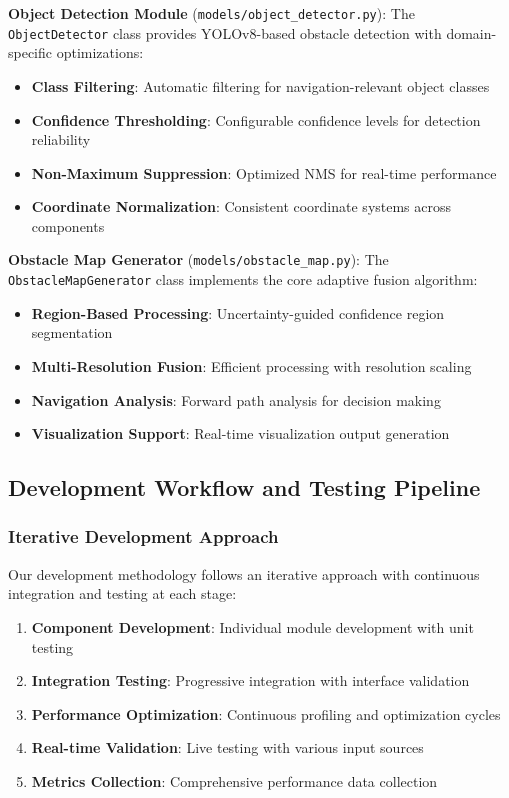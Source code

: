 \documentclass[12pt,oneside]{book}
\begin{document}
\textbf{Object Detection Module} (\texttt{models/object\_detector.py}):
The \texttt{ObjectDetector} class provides YOLOv8-based obstacle detection with domain-specific optimizations:

\begin{itemize}
\item \textbf{Class Filtering}: Automatic filtering for navigation-relevant object classes
\item \textbf{Confidence Thresholding}: Configurable confidence levels for detection reliability
\item \textbf{Non-Maximum Suppression}: Optimized NMS for real-time performance
\item \textbf{Coordinate Normalization}: Consistent coordinate systems across components
\end{itemize}

\textbf{Obstacle Map Generator} (\texttt{models/obstacle\_map.py}):
The \texttt{ObstacleMapGenerator} class implements the core adaptive fusion algorithm:

\begin{itemize}
\item \textbf{Region-Based Processing}: Uncertainty-guided confidence region segmentation
\item \textbf{Multi-Resolution Fusion}: Efficient processing with resolution scaling
\item \textbf{Navigation Analysis}: Forward path analysis for decision making
\item \textbf{Visualization Support}: Real-time visualization output generation
\end{itemize}

\subsection{Development Workflow and Testing Pipeline}

\subsubsection{Iterative Development Approach}

Our development methodology follows an iterative approach with continuous integration and testing at each stage:

\begin{enumerate}
\item \textbf{Component Development}: Individual module development with unit testing
\item \textbf{Integration Testing}: Progressive integration with interface validation
\item \textbf{Performance Optimization}: Continuous profiling and optimization cycles
\item \textbf{Real-time Validation}: Live testing with various input sources
\item \textbf{Metrics Collection}: Comprehensive performance data collection
\end{enumerate}
\end{document}
